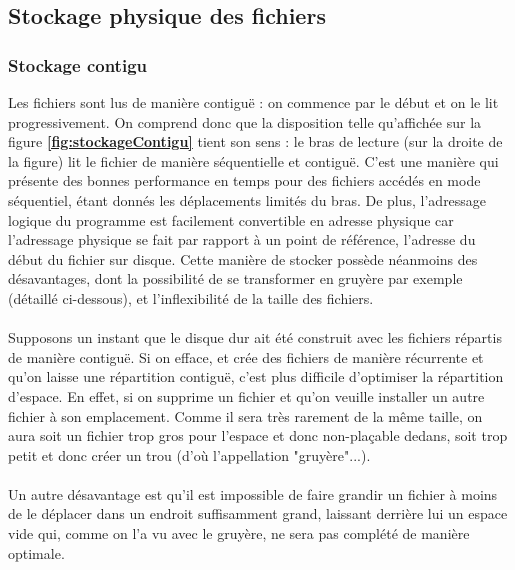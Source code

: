 \documentclass[12pt,a4paper]{report}
\begin{document}
\subsection{Stockage physique des fichiers}
\subsubsection{Stockage contigu}
Les fichiers sont lus de manière contiguë : on commence par le début et on le lit progressivement. On comprend donc que la disposition telle qu'affichée sur la figure \textbf{\ref{fig:stockageContigu}} tient son sens : le bras de lecture (sur la droite de la figure) lit le fichier de manière séquentielle et contiguë. C'est une manière qui présente des bonnes performance en temps pour des fichiers accédés en mode séquentiel, étant donnés les déplacements limités du bras. De plus, l'adressage logique du programme est facilement convertible en adresse physique car l'adressage physique se fait par rapport à un point de référence, l'adresse du début du fichier sur disque. Cette manière de stocker possède néanmoins des désavantages, dont la possibilité de se transformer en gruyère par exemple (détaillé ci-dessous), et l'inflexibilité de la taille des fichiers. \\
\\
Supposons un instant que le disque dur ait été construit avec les fichiers répartis de manière contiguë. Si on efface, et crée des fichiers de manière récurrente et qu'on laisse une répartition contiguë, c'est plus difficile d'optimiser la répartition d'espace. En effet, si on supprime un fichier et qu'on veuille installer un autre fichier à son emplacement. Comme il sera très rarement de la même taille, on aura soit un fichier trop gros pour l'espace et donc non-plaçable dedans, soit trop petit et donc créer un trou (d'où l'appellation "gruyère"...).  \\
\\
Un autre désavantage est qu'il est impossible de faire grandir un fichier à moins de le déplacer dans un endroit suffisamment grand, laissant derrière lui un espace vide qui, comme on l'a vu avec le gruyère, ne sera pas complété de manière optimale.
\end{document}
